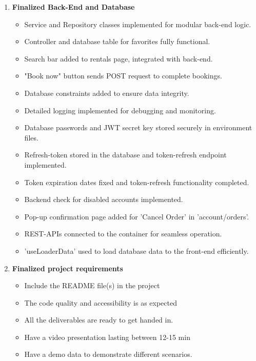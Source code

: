 \documentclass[a4paper,12pt]{article}
\begin{document}
\begin{enumerate}
\begin{itemize}
    \end{itemize}
    \item \textbf{Finalized Back-End and Database}
    \begin{itemize}
        \item Service and Repository classes implemented for modular back-end logic.
        \item Controller and database table for favorites fully functional.
        \item Search bar added to rentals page, integrated with back-end.
        \item "Book now" button sends POST request to complete bookings.
        \item Database constraints added to ensure data integrity.
        \item Detailed logging implemented for debugging and monitoring.
        \item Database passwords and JWT secret key stored securely in environment files.
        \item Refresh-token stored in the database and token-refresh endpoint implemented.
        \item Token expiration dates fixed and token-refresh functionality completed.
        \item Backend check for disabled accounts implemented.
        \item Pop-up confirmation page added for 'Cancel Order' in 'account/orders'.
        \item REST-APIs connected to the container for seamless operation.
        \item 'useLoaderData' used to load database data to the front-end efficiently.
    \end{itemize}
\item \textbf{Finalized project requirements}
    \begin{itemize}
        \item Include the README file(s) in the project
        \item The code quality and accessibility is as expected
        \item All the deliverables are ready to get handed in.
        \item Have a video presentation lasting between 12-15 min
        \item Have a demo data to demonstrate different scenarios.
    \end{itemize}
\end{enumerate}
\end{document}
